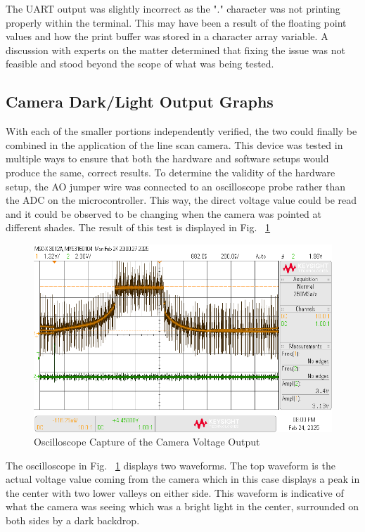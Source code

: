 \documentclass[conference]{IEEEtran}
\begin{document}
The UART output was slightly incorrect as the "." character was not printing properly within the terminal. This may have been a result of the floating point values and how the print buffer was stored in a character array variable. A discussion with experts on the matter determined that fixing the issue was not feasible and stood beyond the scope of what was being tested.

\subsection{Camera Dark/Light Output Graphs}

With each of the smaller portions independently verified, the two could finally be combined in the application of the line scan camera. This device was tested in multiple ways to ensure that both the hardware and software setups would produce the same, correct results. To determine the validity of the hardware setup, the AO jumper wire was connected to an oscilloscope probe rather than the ADC on the microcontroller. This way, the direct voltage value could be read and it could be observed to be changing when the camera was pointed at different shades. The result of this test is displayed in Fig. ~\ref{oscilloscope}

\begin{figure}
    \centering
    \includegraphics[width=\linewidth]{images/part3scope.png}
    \caption{Oscilloscope Capture of the Camera Voltage Output}
    \label{oscilloscope}
\end{figure}

The oscilloscope in Fig. ~\ref{oscilloscope} displays two waveforms. The top waveform is the actual voltage value coming from the camera which in this case displays a peak in the center with two lower valleys on either side. This waveform is indicative of what the camera was seeing which was a bright light in the center, surrounded on both sides by a dark backdrop.
\end{document}
